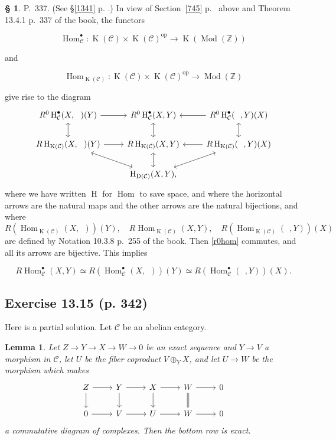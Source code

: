\documentclass[12pt]{article}
\newtheorem{lem}[thm]{Lemma}
\theoremstyle{remark}
\theoremstyle{definition}
\newtheorem{s}[thm]{\S}
\newcommand{\bu}{\bullet}
\newcommand{\nn}{\noindent}
\newcommand{\oo}{\operatorname}
\newcommand{\C}{\mathcal C}
\DeclareMathOperator{\Hom}{Hom}
\DeclareMathOperator{\Mod}{Mod}
\DeclareMathOperator{\op}{op}
\begin{document}
\begin{s}
P.~337. (See \S\ref{1341} p. \pageref{1341}.) In view of Section~\ref{745} p.~\pageref{745} above and Theorem 13.4.1 p.~337 of the book, the functors 

$$
\Hom_\C^\bu:\oo K(\C)\times\oo K(\C)^{\op}\to\oo K(\Mod(\mathbb Z))
$$ 

\nn and 

$$
\Hom_{\oo K(\C)}:\oo K(\C)\times\oo K(\C)^{\op}\to\Mod(\mathbb Z)
$$ 

\nn give rise to the diagram 
%
\begin{equation}\label{r0hom}
\begin{tikzcd}
R^0\oo H_\C^\bu(X,\ \ )(Y)\ar[leftrightarrow]{d}\ar{r}&
R^0\oo H_\C^\bu(X,Y)\ar[leftrightarrow]{d}&
R^0\oo H_\C^\bu(\ \ ,Y)(X)\ar{l}\ar[leftrightarrow]{d}\\ 
%
R\oo H_{\oo K(\C)}(X,\ \ )(Y)\ar[leftrightarrow]{dr}\ar{r}&
R\oo H_{\oo K(\C)}(X,Y)\ar[leftrightarrow]{d}&
R\oo H_{\oo K(\C)}(\ \ ,Y)(X)\ar{l}\ar[leftrightarrow]{dl}\\ 
%
&\oo H_{\oo D(\C)}(X,Y),
\end{tikzcd}
\end{equation}
%
where we have written $\oo H$ for $\Hom$ to save space, and where the horizontal arrows are the natural maps and the other arrows are the natural bijections, and where 
$$
R(\Hom_{\oo K(\C)}(X,\ \ ))(Y),\quad R\Hom_{\oo K(\C)}(X,Y),\quad R(\Hom_{\oo K(\C)}(\ \ ,Y))(X)
$$ 
are defined by Notation 10.3.8 p.~255 of the book. Then \eqref{r0hom} commutes, and all its arrows are bijective. This implies 

$$
R\Hom_\C^\bu(X,Y)\simeq R(\Hom_\C^\bu(X,\ \ ))(Y)\simeq R(\Hom_\C^\bu(\ \ ,Y))(X).
$$
\end{s}


\subsection{Exercise 13.15 (p. 342)}

Here is a partial solution. Let $\C$ be an abelian category. 

\begin{lem}\label{738}
Let $Z\to Y\to X\to W\to0$ be an exact sequence and $Y\to V$ a morphism in $\C$, let $U$ be the fiber coproduct $V\oplus_YX$, and let $U\to W$ be the morphism which makes 
$$
\begin{tikzcd}
Z\ar{d}\ar{r}&Y\ar{d}\ar{r}&X\ar{d}\ar{r}&W\ar[equal]{d}\ar{r}&0\\ 
0\ar{r}&V\ar{r}&U\ar{r}&W\ar{r}&0
\end{tikzcd}
$$ 
a commutative diagram of complexes. Then the bottom row is exact.
\end{lem}
\end{document}
